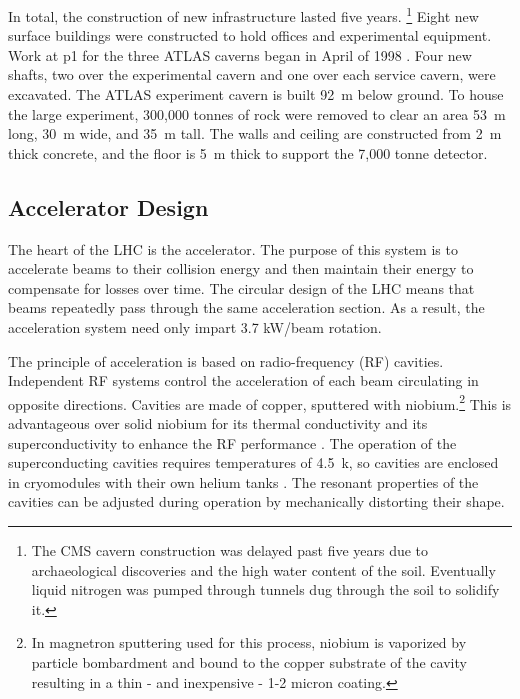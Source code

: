 In total, the construction of new infrastructure lasted five years.
\footnote{The CMS cavern construction was delayed past five years due to archaeological discoveries and the high water content of the soil. Eventually liquid nitrogen was pumped through tunnels dug through the soil to solidify it.}
Eight new surface buildings were constructed to hold offices and experimental equipment. 
Work at p1 for the three ATLAS caverns began in April of 1998 \cite{lhcDesignV2}.
Four new shafts, two over the experimental cavern and one over each service cavern, were excavated.
The ATLAS experiment cavern is built 92~m below ground. 
To house the large experiment, 300,000 tonnes of rock were removed to clear an area 53~m long, 30~m wide, and 35~m tall.
The walls and ceiling are constructed from 2~m thick concrete, and the floor is 5~m thick to support the 7,000 tonne detector.


\subsection{Accelerator Design}
The heart of the LHC is the accelerator.
The purpose of this system is to accelerate beams to their collision energy and then maintain their energy to compensate for losses over time.
The circular design of the LHC means that beams repeatedly pass through the same acceleration section.
As a result, the acceleration system need only impart 3.7 kW/beam rotation.

The principle of acceleration is based on radio-frequency (RF) cavities.
Independent RF systems control the acceleration of each beam circulating in opposite directions.
Cavities are made of copper, sputtered with niobium.\footnote{In magnetron sputtering used for this process, niobium is vaporized by particle bombardment and bound to the copper substrate of the cavity resulting in a thin - and inexpensive - 1-2 micron coating.}
This is advantageous over solid niobium for its thermal conductivity and its superconductivity to enhance the RF performance \cite{lyndon}.
The operation of the superconducting cavities requires temperatures of 4.5~k, so cavities are enclosed in cryomodules with their own helium tanks \cite{boussard}.
The resonant properties of the cavities can be adjusted during operation by mechanically distorting their shape.


